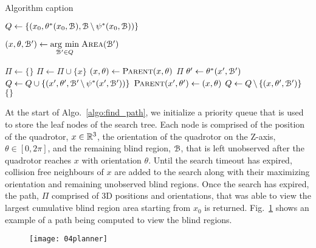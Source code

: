 \begin{algorithm}[h!]
    \caption{Algorithm caption}
    \label{algo:find_path}
    \begin{algorithmic}[1]
        \setcounter{ALC@line}{0}

        \STATE $Q \leftarrow \{(x_0, \theta^*(x_0, {{\mathcal{B}}}),
            {{\mathcal{B}}} \, \backslash \, \psi^*(x_0, {{\mathcal{B}}}))\}$

        \STATE $(x, \theta, {{\mathcal{B'}}}) \leftarrow \underset{{{\mathcal{B'}}} \in Q}{\operatorname{arg}\,\operatorname{min}}\; {\textsc{Area}}({{\mathcal{B'}}})$

                \STATE $\Pi \leftarrow \{\}$
                    \STATE $\Pi \leftarrow \Pi \cup \{x\}$
                    \STATE $(x, \theta) \leftarrow {\textsc{Parent}}(x, \theta)$
                \ENDWHILE
                \RETURN $\Pi$
            \ENDIF
            \STATE $\theta' \leftarrow \theta^*(x', {{\mathcal{B'}}})$
            \STATE $Q \leftarrow Q \cup \{(x', \theta', {{\mathcal{B'}}} \, \backslash \,
                    \psi^*(x', {{\mathcal{B'}}}))\}$
                \STATE ${\textsc{Parent}}(x', \theta') \leftarrow (x, \theta)$
            \ENDFOR
            \STATE $Q \leftarrow Q \, \backslash \, \{(x, \theta', {{\mathcal{B'}}})\}$
        \ENDWHILE
        \RETURN $\{\}$

    \end{algorithmic}
\end{algorithm}

At the start of Algo.~\ref{algo:find_path}, we initialize a priority queue that
is used to store the leaf nodes of the search tree. Each node is comprised of
the position of the quadrotor, $x \in \mathbb{R}^3$, the orientation of the quadrotor
on the Z-axis, $\theta \in [0, 2\pi]$, and the remaining blind region, ${{\mathcal{B}}}$,
that is left unobserved after the quadrotor reaches $x$ with orientation
$\theta$. Until the search timeout has expired, collision free neighbours of
$x$ are added to the search along with their maximizing orientation and
remaining unobserved blind regions.  Once the search has expired, the path,
$\Pi$ comprised of 3D positions and orientations, that was able to view the
largest cumulative blind region area starting from $x_0$ is returned.
Fig.~\ref{fig:planner} shows an example of a path being computed to view the
blind regions.

\begin{figure}[h!]

    \centering

    \texttt{[image: 04planner]}

    \caption{}

    \label{fig:planner}

\end{figure}
